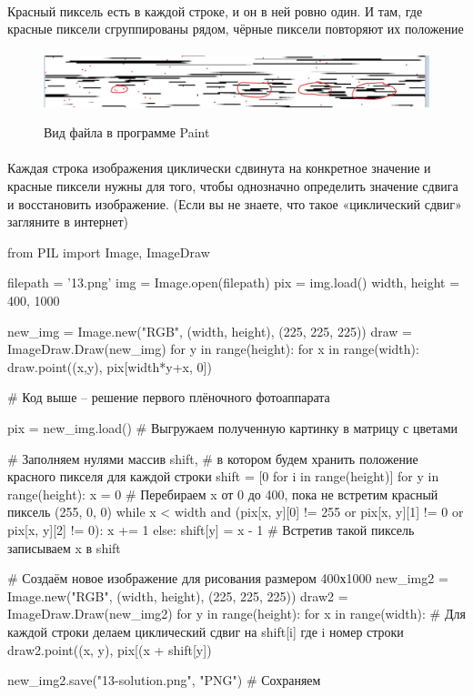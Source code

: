 \documentclass[12pt]{article}
\begin{document}
    \paragraph{}
    Красный пиксель есть в каждой строке, и он в ней ровно один.
    И там, где красные пиксели сгруппированы рядом, чёрные пиксели повторяют их положение
    \paragraph{}
    \begin{figure}[H]
        \centering
        \includegraphics[width=\linewidth]{task13}
        \label{fig:task13}
        \caption{Вид файла в программе Paint}
    \end{figure}
    \paragraph{}
    Каждая строка изображения циклически сдвинута на конкретное значение и красные пиксели нужны для того,
    чтобы однозначно определить значение сдвига и восстановить изображение.
    (Если вы не знаете, что такое «циклический сдвиг» загляните в интернет)
    \begin{pythoncode}
from PIL import Image, ImageDraw

filepath = '13.png'
img = Image.open(filepath)
pix = img.load()
width, height = 400, 1000

new_img = Image.new("RGB", (width, height), (225, 225, 225))
draw = ImageDraw.Draw(new_img)
for y in range(height):
    for x in range(width):
        draw.point((x,y), pix[width*y+x, 0])

# Код выше -- решение первого плёночного фотоаппарата

pix = new_img.load()        # Выгружаем полученную картинку в матрицу с цветами

# Заполняем нулями массив shift,
# в котором будем хранить положение красного пикселя для каждой строки
shift = [0 for i in range(height)]
for y in range(height):
    x = 0  # Перебираем x от 0 до 400, пока не встретим красный пиксель (255, 0, 0)
    while x < width and (pix[x, y][0] != 255 or pix[x, y][1] != 0 or pix[x, y][2] != 0):
        x += 1
    else:
        shift[y] = x - 1  # Встретив такой пиксель записываем x в shift

# Создаём новое изображение для рисования размером 400х1000
new_img2 = Image.new("RGB", (width, height), (225, 225, 225))
draw2 = ImageDraw.Draw(new_img2)
for y in range(height):
    for x in range(width):
        # Для каждой строки делаем циклический сдвиг на shift[i] где i номер строки
        draw2.point((x, y), pix[(x + shift[y]) %

new_img2.save("13-solution.png", "PNG")  # Сохраняем

    \end{pythoncode}
\end{document}
